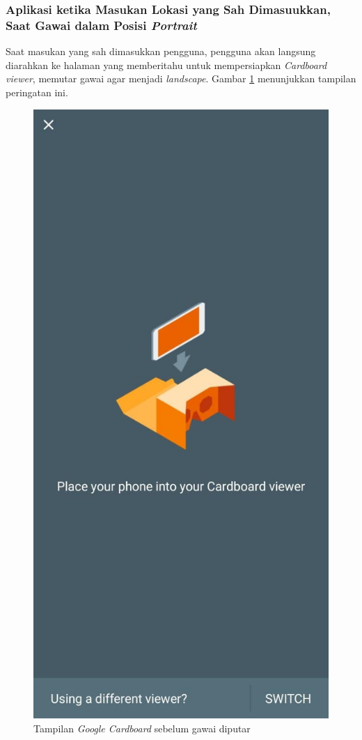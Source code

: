 \subsubsection{Aplikasi ketika Masukan Lokasi yang Sah Dimasuukkan, Saat Gawai dalam Posisi \textit{Portrait}}
Saat masukan yang sah dimasukkan pengguna, pengguna akan langsung diarahkan ke halaman yang memberitahu untuk mempersiapkan \textit{Cardboard viewer}, memutar gawai agar menjadi \textit{landscape}. Gambar \ref{fig:cardboard-page} menunjukkan tampilan peringatan ini.

\begin{figure}
\centering
\includegraphics[scale=0.3]{Gambar/cardboard-page.png}
    \caption{Tampilan \textit{Google Cardboard} sebelum gawai diputar}
    \label{fig:cardboard-page}
\end{figure}

